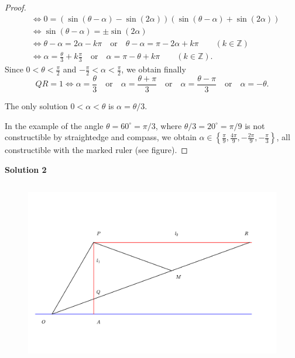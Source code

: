 \documentclass[11pt,a4paper]{article}
\newcommand{\Z}{\mathbb{Z}}
\begin{document}
\begin{proof}
\begin{align*}
 &\iff 0 = (\sin(\theta - \alpha) - \sin (2\alpha))(\sin(\theta - \alpha) + \sin (2\alpha))\\
 &\iff \sin(\theta - \alpha) =  \pm \sin (2\alpha)\\
 &\iff \theta -\alpha = 2 \alpha - k \pi  \quad \mathrm{or} \quad \theta - \alpha =  \pi - 2 \alpha + k \pi \qquad (k\in \Z)\\
 &\iff \alpha = \frac{\theta}{3} + k \frac{\pi}{3} \quad \mathrm{or} \quad \alpha = \pi - \theta + k \pi  \qquad (k \in \Z).
\end{align*}
Since $0 <\theta  < \frac{\pi}{2}$ and $-\frac{\pi}{2} < \alpha < \frac{\pi}{2}$, we obtain finally
$$QR = 1 \iff \alpha = \frac{\theta}{3} \quad \mathrm{or} \quad \alpha = \frac{\theta + \pi}{3}  \quad \mathrm{or} \quad \alpha = \frac{\theta - \pi}{3} \quad \mathrm{or} \quad  \alpha = -\theta .$$

The only solution $0 < \alpha < \theta$ is $\alpha = \theta/3$.

In the example of the angle $\theta = 60^{\circ} = \pi/3$, where $\theta/3 = 20^{\circ} = \pi/9$ is not constructible by straightedge and compass, we obtain $\alpha \in \left \{ \frac{\pi}{9}, \frac{4\pi}{9},-\frac{2\pi}{9}, - \frac{\pi}{3}\right \}$, all constructible with the marked ruler (see figure).
\end{proof}

{\bf Solution 2}
\begin{figure}[htbp]
\begin{center}
\includegraphics[width=11.7cm,height=8.1cm]{markedRulers6.pdf}
\end{center}
\end{figure}
\end{document}
